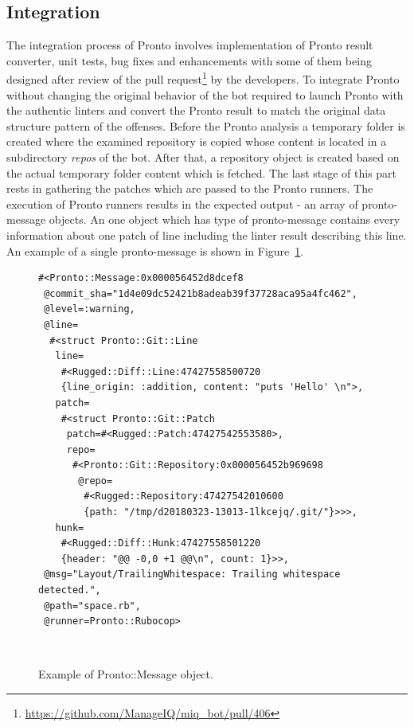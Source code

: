 \subsection{Integration}

The integration process of Pronto involves implementation of Pronto result converter, unit tests, bug fixes and enhancements with some of them being designed after review of the pull request\footnote{\url{https://github.com/ManageIQ/miq_bot/pull/406}} by the developers. To integrate Pronto without changing the original behavior of the bot required to launch Pronto with the authentic linters and convert the Pronto result to match the original data structure pattern of the offenses. Before the Pronto analysis a temporary folder is created where the examined repository is copied whose content is located in a subdirectory \textit{repos} of the bot. After that, a repository object is created based on the actual temporary folder content which is fetched. The last stage of this part rests in gathering the patches which are passed to the Pronto runners. The execution of Pronto runners results in the expected output - an array of pronto-message objects. An one object which has type of pronto-message contains every information about one patch of line including the linter result describing this line. An example of a single pronto-message is shown in Figure~\ref{fig:pronto_message}.

\begin{figure}[H]
\begin{lstlisting}[basicstyle=\scriptsize, xleftmargin=.21\textwidth]
#<Pronto::Message:0x000056452d8dcef8
 @commit_sha="1d4e09dc52421b8adeab39f37728aca95a4fc462",
 @level=:warning,
 @line=
  #<struct Pronto::Git::Line
   line=
    #<Rugged::Diff::Line:47427558500720
    {line_origin: :addition, content: "puts 'Hello' \n">,
   patch=
    #<struct Pronto::Git::Patch
     patch=#<Rugged::Patch:47427542553580>,
     repo=
      #<Pronto::Git::Repository:0x000056452b969698
       @repo=
        #<Rugged::Repository:47427542010600
        {path: "/tmp/d20180323-13013-1lkcejq/.git/"}>>>,
   hunk=
    #<Rugged::Diff::Hunk:47427558501220
    {header: "@@ -0,0 +1 @@\n", count: 1}>>,
 @msg="Layout/TrailingWhitespace: Trailing whitespace detected.",
 @path="space.rb",
 @runner=Pronto::Rubocop>
\end{lstlisting}
\hfill\\[-3em]
\caption{Example of Pronto::Message object.}
\label{fig:pronto_message}
\end{figure}


